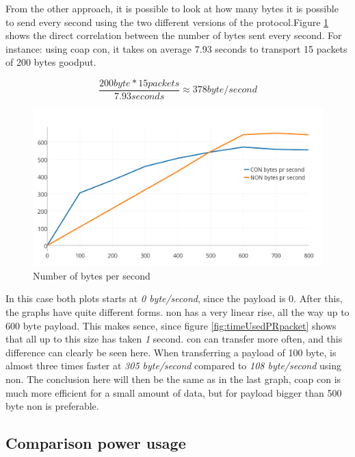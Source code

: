 From the other approach, it is possible to look at how many bytes it is possible to send every second using the two different versions of the protocol.Figure \ref{fig:bytesPRSecond2}  shows the direct correlation between the number of bytes sent every second. For instance: using \gls{coap} \gls{con}, it takes on average 7.93 seconds to transport 15 packets of 200 bytes goodput. 

\begin{equation} \label{CONexampleFig411}
	\frac{200 byte * 15 packets}{7.93 seconds} \approx 378 byte/second
\end{equation}


\begin{figure}[ht]
    \centering
    \includegraphics[scale=1.0]{bytesPRSecond2.png}    
    \caption{Number of bytes per second}
    \label{fig:bytesPRSecond2}
\end{figure}



In this case both plots starts at \textit{0 byte/second}, since the payload is 0. After this, the graphs have quite different forms. \gls{non} has a very linear rise, all the way up to 600 byte payload. This makes sence, since figure \ref{fig:timeUsedPRpacket} shows that all up to this size has taken \textit{1} second. \gls{con} can transfer more often, and this difference can clearly be seen here. When transferring a payload of 100 byte, is almost three times faster at \textit{305 byte/second} compared to \textit{108 byte/second} using \gls{non}. The conclusion here will then be the same as in the last graph, \gls{coap} \gls{con} is much more efficient for a small amount of data, but for payload bigger than 500 byte \gls{non} is preferable. 


\subsection{Comparison power usage}


